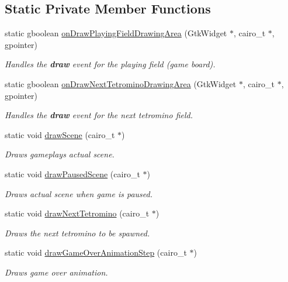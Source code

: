 \subsection*{Static Private Member Functions}
\begin{DoxyCompactItemize}
\item 
static gboolean \hyperlink{classTetreesUI_a829fc73fdc1f45fb567168f2c37ab012}{on\+Draw\+Playing\+Field\+Drawing\+Area} (Gtk\+Widget $\ast$, cairo\+\_\+t $\ast$, gpointer)
\begin{DoxyCompactList}\small\item\em Handles the {\bfseries draw} event for the playing field (game board). \end{DoxyCompactList}\item 
static gboolean \hyperlink{classTetreesUI_aa775d6f3e3ca5c11ec3bb73e8dd7f62d}{on\+Draw\+Next\+Tetromino\+Drawing\+Area} (Gtk\+Widget $\ast$, cairo\+\_\+t $\ast$, gpointer)
\begin{DoxyCompactList}\small\item\em Handles the {\bfseries draw} event for the next tetromino field. \end{DoxyCompactList}\item 
static void \hyperlink{classTetreesUI_a357ae7240cc5f35b5d61244e7a6bcfe3}{draw\+Scene} (cairo\+\_\+t $\ast$)
\begin{DoxyCompactList}\small\item\em Draws gameplay\textquotesingle{}s actual scene. \end{DoxyCompactList}\item 
static void \hyperlink{classTetreesUI_a7d39f8caa75f5e755e3cebb0e05bb779}{draw\+Paused\+Scene} (cairo\+\_\+t $\ast$)
\begin{DoxyCompactList}\small\item\em Draws actual scene when game is paused. \end{DoxyCompactList}\item 
static void \hyperlink{classTetreesUI_a9f4fa68c99e9d6146d9bdf2baa9db4d6}{draw\+Next\+Tetromino} (cairo\+\_\+t $\ast$)
\begin{DoxyCompactList}\small\item\em Draws the next tetromino to be spawned. \end{DoxyCompactList}\item 
static void \hyperlink{classTetreesUI_a4d16e60b9a27bfbc2aac1deba09cc74c}{draw\+Game\+Over\+Animation\+Step} (cairo\+\_\+t $\ast$)
\begin{DoxyCompactList}\small\item\em Draws game over animation. \end{DoxyCompactList}\item 

\end{DoxyCompactItemize}
